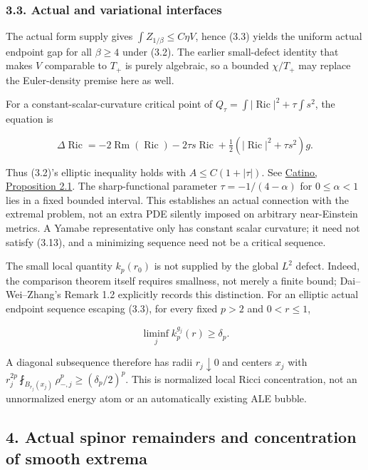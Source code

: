 \documentclass[
  10pt,
]{article}
\begin{document}
\hypertarget{actual-and-variational-interfaces}{%
\subsubsection{3.3. Actual and variational
interfaces}\label{actual-and-variational-interfaces}}

The actual form supply gives \(\int Z_{1/\beta}\le C\eta V\), hence
(3.3) yields the uniform actual endpoint gap for all \(\beta\ge4\) under
(3.2). The earlier small-defect identity that makes \(V\) comparable to
\(T_+\) is purely algebraic, so a bounded \(\chi/T_+\) may replace the
Euler-density premise here as well.

For a constant-scalar-curvature critical point of
\(Q_\tau=\int|\operatorname{Ric}|^2+\tau\int s^2\), the equation is

\[
 \Delta\operatorname{Ric}
 =-2\operatorname{Rm}(\operatorname{Ric})
   -2\tau s\operatorname{Ric}
                   +\tfrac12(|\operatorname{Ric}|^2+\tau s^2)g.
                                                        \tag{3.13}
\]

Thus (3.2)'s elliptic inequality holds with \(A\le C(1+|\tau|)\). See
\href{https://arxiv.org/abs/1404.0569}{Catino, Proposition 2.1}. The
sharp-functional parameter \(\tau=-1/(4-\alpha)\) for \(0\le\alpha<1\)
lies in a fixed bounded interval. This establishes an actual connection
with the extremal problem, not an extra PDE silently imposed on
arbitrary near-Einstein metrics. A Yamabe representative only has
constant scalar curvature; it need not satisfy (3.13), and a minimizing
sequence need not be a critical sequence.

The small local quantity \(k_p(r_0)\) is not supplied by the global
\(L^2\) defect. Indeed, the comparison theorem itself requires
smallness, not merely a finite bound; Dai--Wei--Zhang's Remark 1.2
explicitly records this distinction. For an elliptic actual endpoint
sequence escaping (3.3), for every fixed \(p>2\) and \(0<r\le1\),

\[
                         \liminf_j k_p^{g_j}(r)\ge\delta_p.      \tag{3.14}
\]

A diagonal subsequence therefore has radii \(r_j\downarrow0\) and
centers \(x_j\) with
\(r_j^{2p}\fint_{B_{r_j}(x_j)}\rho_{-,j}^p \ge(\delta_p/2)^p\). This is
normalized local Ricci concentration, not an unnormalized energy atom or
an automatically existing ALE bubble.

\hypertarget{actual-spinor-remainders-and-concentration-of-smooth-extrema}{%
\subsection{4. Actual spinor remainders and concentration of smooth
extrema}\label{actual-spinor-remainders-and-concentration-of-smooth-extrema}}
\end{document}
